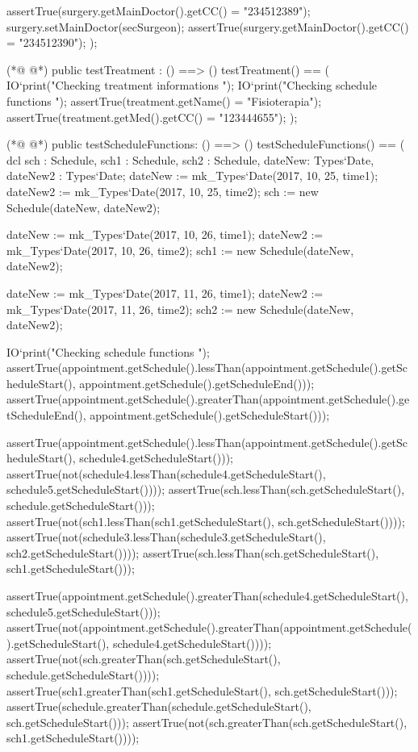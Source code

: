 \begin{vdmpp}[breaklines=true]
   assertTrue(surgery.getMainDoctor().getCC() = "234512389");
   surgery.setMainDoctor(secSurgeon);
   assertTrue(surgery.getMainDoctor().getCC() = "234512390");
 );
 
(*@
\label{testTreatment:247}
@*)
 public testTreatment : () ==> ()
  testTreatment() == (
   IO`print("\n Checking treatment informations \n");
   IO`print("\n Checking schedule functions \n");
   assertTrue(treatment.getName() = "Fisioterapia");
   assertTrue(treatment.getMed().getCC() = "123444655");
  );
  
(*@
\label{testScheduleFunctions:255}
@*)
  public testScheduleFunctions: () ==> ()
  testScheduleFunctions() == (
   dcl sch : Schedule, sch1 : Schedule, sch2 : Schedule, dateNew: Types`Date, dateNew2 : Types`Date;
   dateNew := mk_Types`Date(2017, 10, 25, time1);
   dateNew2 := mk_Types`Date(2017, 10, 25, time2);
   sch := new Schedule(dateNew, dateNew2);
   
   dateNew := mk_Types`Date(2017, 10, 26, time1);
   dateNew2 := mk_Types`Date(2017, 10, 26, time2);
   sch1 := new Schedule(dateNew, dateNew2);
   
   dateNew := mk_Types`Date(2017, 11, 26, time1);
   dateNew2 := mk_Types`Date(2017, 11, 26, time2);
   sch2 := new Schedule(dateNew, dateNew2);
   
   IO`print("\n Checking schedule functions \n");
   assertTrue(appointment.getSchedule().lessThan(appointment.getSchedule().getScheduleStart(), appointment.getSchedule().getScheduleEnd()));
   assertTrue(appointment.getSchedule().greaterThan(appointment.getSchedule().getScheduleEnd(), appointment.getSchedule().getScheduleStart()));
   
   assertTrue(appointment.getSchedule().lessThan(appointment.getSchedule().getScheduleStart(), schedule4.getScheduleStart()));
   assertTrue(not(schedule4.lessThan(schedule4.getScheduleStart(), schedule5.getScheduleStart())));
   assertTrue(sch.lessThan(sch.getScheduleStart(), schedule.getScheduleStart()));
   assertTrue(not(sch1.lessThan(sch1.getScheduleStart(), sch.getScheduleStart())));
   assertTrue(not(schedule3.lessThan(schedule3.getScheduleStart(), sch2.getScheduleStart())));
   assertTrue(sch.lessThan(sch.getScheduleStart(), sch1.getScheduleStart()));
   
   assertTrue(appointment.getSchedule().greaterThan(schedule4.getScheduleStart(), schedule5.getScheduleStart()));
   assertTrue(not(appointment.getSchedule().greaterThan(appointment.getSchedule().getScheduleStart(), schedule4.getScheduleStart())));
   assertTrue(not(sch.greaterThan(sch.getScheduleStart(), schedule.getScheduleStart())));
   assertTrue(sch1.greaterThan(sch1.getScheduleStart(), sch.getScheduleStart()));
   assertTrue(schedule.greaterThan(schedule.getScheduleStart(), sch.getScheduleStart()));
   assertTrue(not(sch.greaterThan(sch.getScheduleStart(), sch1.getScheduleStart())));
   

\end{vdmpp}
